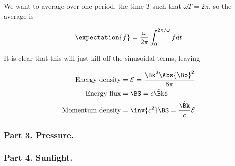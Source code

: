 We want to average over one period, the time $T$ such that $\omega T = 2 \pi$, so the average is

\begin{equation}\label{eqn:relativisticElectrodynamicsL16:360}
\expectation{f} = \frac{\omega}{2\pi} \int_0^{2\pi/\omega} f dt.
\end{equation}

It is clear that this will just kill off the sinusoidal terms, leaving

\begin{align}\label{eqn:relElectroDynProblemSet4:350b}
\mbox{Energy density} &= \mathcal{E} = \frac{ \Bk^2 \Abs{\Bb}^2 }{8\pi} \\
\mbox{Energy flux} &= \BS = c \hat{\Bk} \mathcal{E} \\
\mbox{Momentum density} &= \inv{c^2} \BS = \frac{\hat{\Bk}}{c} \mathcal{E}.
\end{align}

\subsubsection{Part 3.  Pressure.}
\subsubsection{Part 4.  Sunlight.}



\EndArticle
